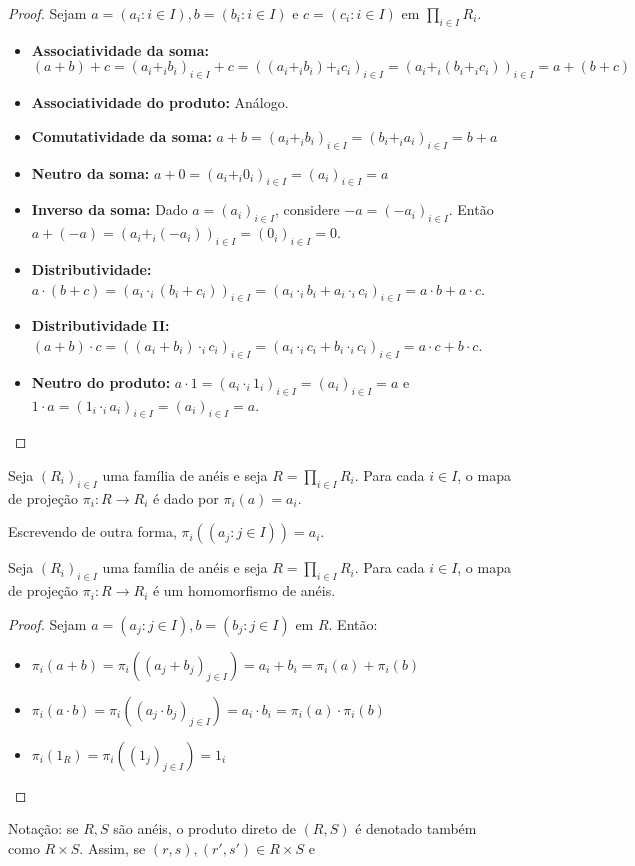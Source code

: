 \begin{proof}
    Sejam $a=(a_i: i \in I), b=(b_i: i \in I)$ e $c=(c_i: i \in I)$ em $\prod_{i \in I}R_i$.
    \begin{itemize}
        \item \textbf{Associatividade da soma:} $(a+b)+c=(a_i+_i b_i)_{i \in I}+c=((a_i+_i b_i)+_ic_i)_{i \in I}=(a_i+_i (b_i+_i c_i))_{i \in I}=a+(b+c)$
        \item \textbf{Associatividade do produto:} Análogo.
        \item \textbf{Comutatividade da soma:} $a+b=(a_i+_i b_i)_{i \in I}=(b_i+_i a_i)_{i \in I}=b+a$
        \item \textbf{Neutro da soma:} $a+0=(a_i+_i 0_i)_{i \in I}=(a_i)_{i \in I}=a$
        \item \textbf{Inverso da soma:} Dado $a=(a_i)_{i \in I}$, considere $-a=(-a_i)_{i \in I}$. Então $a+(-a)=(a_i+_i (-a_i))_{i \in I}=(0_i)_{i \in I}=0$.
        \item \textbf{Distributividade:} $a\cdot (b+c)=(a_i\cdot _i (b_i+c_i))_{i \in I}=(a_i\cdot _i b_i+a_i\cdot _i c_i)_{i \in I}=a\cdot b+a\cdot c$.
        \item \textbf{Distributividade II:} $(a+b)\cdot c=((a_i+b_i)\cdot _i c_i)_{i \in I}=(a_i\cdot _i c_i+b_i\cdot _i c_i)_{i \in I}=a\cdot c+b\cdot c$.
        \item \textbf{Neutro do produto:} $a\cdot 1=(a_i\cdot _i 1_i)_{i \in I}=(a_i)_{i \in I}=a$ e $1\cdot a=(1_i\cdot _i a_i)_{i \in I}=(a_i)_{i \in I}=a$.
    \end{itemize}
\end{proof}
\begin{definition}
    Seja $(R_i)_{i \in I}$ uma família de anéis e seja $R=\prod_{i \in I}R_i$. Para cada $i \in I$, o mapa de projeção $\pi_i:R\rightarrow R_i$ é dado por $\pi_i(a)=a_i$.

    Escrevendo de outra forma, $\pi_i((a_j: j \in I))=a_i$.
\end{definition}

\begin{lemma}
    Seja $(R_i)_{i \in I}$ uma família de anéis e seja $R=\prod_{i \in I}R_i$. Para cada $i \in I$, o mapa de projeção $\pi_i:R\rightarrow R_i$ é um homomorfismo de anéis.
\end{lemma}
\begin{proof}
    Sejam $a=(a_j: j \in I), b=(b_j: j \in I)$ em $R$. Então:
    \begin{itemize}
        \item $\pi_i(a+b)=\pi_i((a_j+b_j)_{j \in I})=a_i+b_i=\pi_i(a)+\pi_i(b)$
        \item $\pi_i(a\cdot b)=\pi_i((a_j\cdot b_j)_{j \in I})=a_i\cdot b_i=\pi_i(a)\cdot \pi_i(b)$
        \item $\pi_i(1_R)=\pi_i((1_j)_{j \in I})=1_{i}$
    \end{itemize}
\end{proof}
Notação: se $R, S$ são anéis, o produto direto de $(R, S)$ é denotado também como $R\times S$. Assim, se $(r, s), (r', s')\in R\times S$ e 


